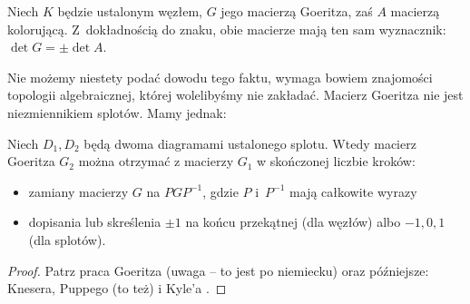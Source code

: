 \begin{proposition}
    Niech $K$ będzie ustalonym węzłem, $G$ jego macierzą Goeritza, zaś $A$ macierzą kolorującą.
    Z~dokładnością do znaku, obie macierze mają ten sam wyznacznik: $\det G = \pm \det A$.
\end{proposition}

Nie możemy niestety podać dowodu tego faktu, wymaga bowiem znajomości topologii algebraicznej, której wolelibyśmy nie zakładać.
Macierz Goeritza nie jest niezmiennikiem splotów.
Mamy jednak:

\begin{proposition}
    Niech $D_1, D_2$ będą dwoma diagramami ustalonego splotu.
    Wtedy macierz Goeritza $G_2$ można otrzymać z macierzy $G_1$ w skończonej liczbie kroków:
    \begin{itemize}
        \item zamiany macierzy $G$ na $PGP^{-1}$, gdzie $P$ i~$P^{-1}$ mają całkowite wyrazy
        \item dopisania lub skreślenia $\pm 1$ na końcu przekątnej (dla węzłów) albo $-1, 0, 1$ (dla splotów).
    \end{itemize}
\end{proposition}

\begin{proof}
%
%
%
%
    Patrz praca Goeritza \cite{goeritz33} (uwaga -- to jest po niemiecku) oraz późniejsze: Knesera, Puppego \cite{kneser53} (to też) i Kyle'a \cite{kyle54}.
\end{proof}


